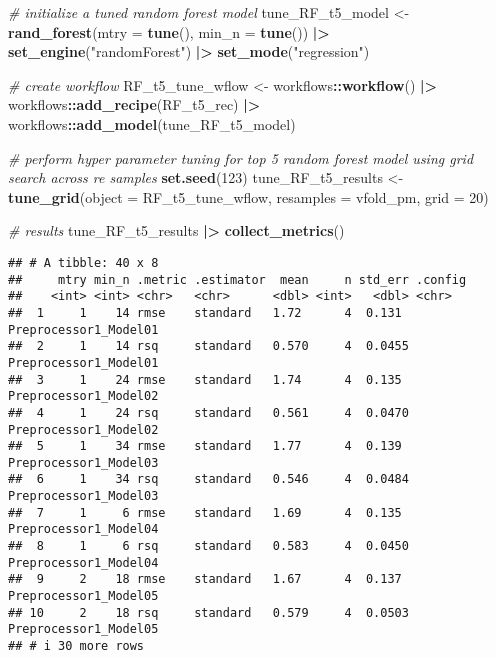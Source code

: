 \documentclass[
]{article}
\newenvironment{Shaded}{\begin{snugshade}}{\end{snugshade}}
\newcommand{\AttributeTok}[1]{\textcolor[rgb]{0.13,0.29,0.53}{#1}}
\newcommand{\CommentTok}[1]{\textcolor[rgb]{0.56,0.35,0.01}{\textit{#1}}}
\newcommand{\DecValTok}[1]{\textcolor[rgb]{0.00,0.00,0.81}{#1}}
\newcommand{\FunctionTok}[1]{\textcolor[rgb]{0.13,0.29,0.53}{\textbf{#1}}}
\newcommand{\NormalTok}[1]{#1}
\newcommand{\OtherTok}[1]{\textcolor[rgb]{0.56,0.35,0.01}{#1}}
\newcommand{\SpecialCharTok}[1]{\textcolor[rgb]{0.81,0.36,0.00}{\textbf{#1}}}
\newcommand{\StringTok}[1]{\textcolor[rgb]{0.31,0.60,0.02}{#1}}
\begin{document}
\begin{Shaded}
\begin{Highlighting}[]
\CommentTok{\# initialize a tuned random forest model}
\NormalTok{tune\_RF\_t5\_model }\OtherTok{\textless{}{-}} \FunctionTok{rand\_forest}\NormalTok{(}\AttributeTok{mtry =} \FunctionTok{tune}\NormalTok{(), }\AttributeTok{min\_n =} \FunctionTok{tune}\NormalTok{()) }\SpecialCharTok{|\textgreater{}}
  \FunctionTok{set\_engine}\NormalTok{(}\StringTok{"randomForest"}\NormalTok{) }\SpecialCharTok{|\textgreater{}}
  \FunctionTok{set\_mode}\NormalTok{(}\StringTok{"regression"}\NormalTok{)}

\CommentTok{\# create workflow}
\NormalTok{RF\_t5\_tune\_wflow }\OtherTok{\textless{}{-}}\NormalTok{ workflows}\SpecialCharTok{::}\FunctionTok{workflow}\NormalTok{() }\SpecialCharTok{|\textgreater{}}
\NormalTok{  workflows}\SpecialCharTok{::}\FunctionTok{add\_recipe}\NormalTok{(RF\_t5\_rec) }\SpecialCharTok{|\textgreater{}}
\NormalTok{  workflows}\SpecialCharTok{::}\FunctionTok{add\_model}\NormalTok{(tune\_RF\_t5\_model)}

\CommentTok{\# perform hyper parameter tuning for top 5 random forest model using grid search across re samples}
\FunctionTok{set.seed}\NormalTok{(}\DecValTok{123}\NormalTok{)}
\NormalTok{tune\_RF\_t5\_results }\OtherTok{\textless{}{-}} \FunctionTok{tune\_grid}\NormalTok{(}\AttributeTok{object =}\NormalTok{ RF\_t5\_tune\_wflow, }\AttributeTok{resamples =}\NormalTok{ vfold\_pm, }\AttributeTok{grid =} \DecValTok{20}\NormalTok{)}

\CommentTok{\# results}
\NormalTok{tune\_RF\_t5\_results }\SpecialCharTok{|\textgreater{}}
  \FunctionTok{collect\_metrics}\NormalTok{()}
\end{Highlighting}
\end{Shaded}

\begin{verbatim}
## # A tibble: 40 x 8
##     mtry min_n .metric .estimator  mean     n std_err .config              
##    <int> <int> <chr>   <chr>      <dbl> <int>   <dbl> <chr>                
##  1     1    14 rmse    standard   1.72      4  0.131  Preprocessor1_Model01
##  2     1    14 rsq     standard   0.570     4  0.0455 Preprocessor1_Model01
##  3     1    24 rmse    standard   1.74      4  0.135  Preprocessor1_Model02
##  4     1    24 rsq     standard   0.561     4  0.0470 Preprocessor1_Model02
##  5     1    34 rmse    standard   1.77      4  0.139  Preprocessor1_Model03
##  6     1    34 rsq     standard   0.546     4  0.0484 Preprocessor1_Model03
##  7     1     6 rmse    standard   1.69      4  0.135  Preprocessor1_Model04
##  8     1     6 rsq     standard   0.583     4  0.0450 Preprocessor1_Model04
##  9     2    18 rmse    standard   1.67      4  0.137  Preprocessor1_Model05
## 10     2    18 rsq     standard   0.579     4  0.0503 Preprocessor1_Model05
## # i 30 more rows
\end{verbatim}
\end{document}
